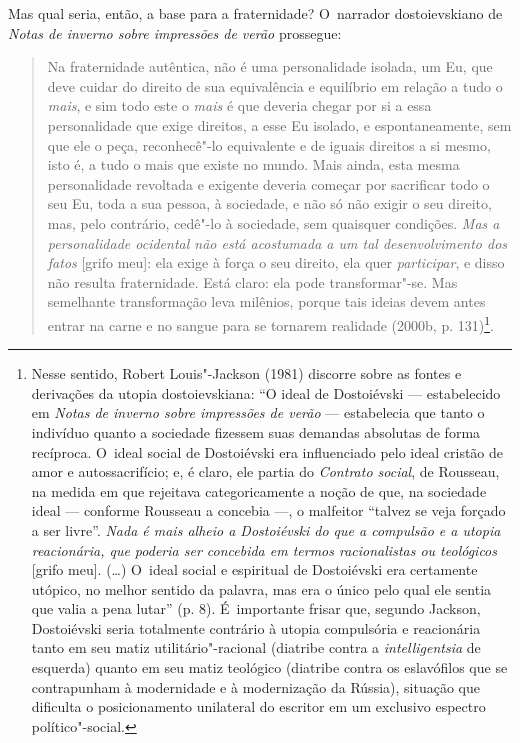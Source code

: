 Mas qual seria, então, a base para a fraternidade? O~narrador
dostoievskiano de \emph{Notas de inverno sobre impressões de verão}
prossegue:

\begin{quote}
Na fraternidade autêntica, não é uma personalidade isolada, um Eu, que
deve cuidar do direito de sua equivalência e equilíbrio em relação a
tudo o \emph{mais}, e sim todo este o \emph{mais} é que deveria chegar
por si a essa personalidade que exige direitos, a esse Eu isolado, e
espontaneamente, sem que ele o peça, reconhecê"-lo equivalente e de
iguais direitos a si mesmo, isto é, a tudo o mais que existe no mundo.
Mais ainda, esta mesma personalidade revoltada e exigente deveria
começar por sacrificar todo o seu Eu, toda a sua pessoa, à sociedade, e
não só não exigir o seu direito, mas, pelo contrário, cedê"-lo à
sociedade, sem quaisquer condições. \emph{Mas a personalidade ocidental
não está acostumada a um tal desenvolvimento dos fatos} {[}grifo meu{]}:
ela exige à força o seu direito, ela quer \emph{participar}, e disso não
resulta fraternidade. Está claro: ela pode transformar"-se. Mas
semelhante transformação leva milênios, porque tais ideias devem antes
entrar na carne e no sangue para se tornarem realidade (2000b, p.
131)\footnote{Nesse sentido, Robert Louis"-Jackson (1981) discorre sobre
  as fontes e derivações da utopia dostoievskiana: ``O ideal de
  Dostoiévski --- estabelecido em \emph{Notas de inverno sobre impressões
  de verão} --- estabelecia que tanto o indivíduo quanto a sociedade
  fizessem suas demandas absolutas de forma recíproca. O~ideal social de
  Dostoiévski era influenciado pelo ideal cristão de amor e
  autossacrifício; e, é claro, ele partia do \emph{Contrato social}, de
  Rousseau, na medida em que rejeitava categoricamente a noção de que,
  na sociedade ideal --- conforme Rousseau a concebia ---, o malfeitor
  ``talvez se veja forçado a ser livre''. \emph{Nada é mais alheio a
  Dostoiévski do que a compulsão e a utopia reacionária, que poderia ser
  concebida em termos racionalistas ou teológicos} {[}grifo meu{]}.
  (\ldots) O~ideal social e espiritual de Dostoiévski era certamente
  utópico, no melhor sentido da palavra, mas era o único pelo qual ele
  sentia que valia a pena lutar'' (p. 8). É~importante frisar que,
  segundo Jackson, Dostoiévski seria totalmente contrário à utopia
  compulsória e reacionária tanto em seu matiz utilitário"-racional
  (diatribe contra a \emph{intelligentsia} de esquerda) quanto em seu
  matiz teológico (diatribe contra os eslavófilos que se contrapunham à
  modernidade e à modernização da Rússia), situação que dificulta o
  posicionamento unilateral do escritor em um exclusivo espectro
  político"-social.}.
\end{quote}

